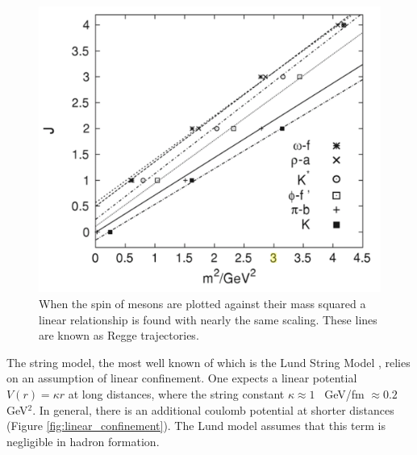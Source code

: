 \begin{figure}
\begin{center}
\includegraphics[width=.55\textwidth]{pics/regge_trajectories}
\end{center}
\caption{When the spin  of mesons are plotted against their mass squared a linear relationship is found with nearly the same scaling. These lines are
known as Regge trajectories.  }
\label{fig:regge}
\end{figure}

The string model, the most well known of which is the Lund String Model \cite{lund}, relies on an assumption
of linear confinement. One expects a linear potential $V(r) = \kappa r$ at long distances, where 
the string constant $\kappa \approx 1$~ GeV/fm $\approx 0.2$ GeV$^2$. In general, 
there is an additional coulomb potential at shorter distances (Figure \ref{fig:linear_confinement}).
The Lund model assumes that this term is negligible in hadron formation. 


